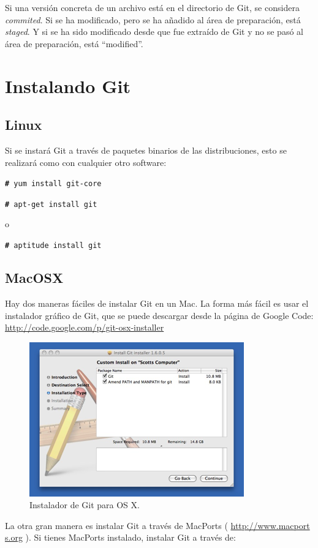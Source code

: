 \documentclass[12pt, spanish, oneside, onecolumn, a4paper]{report}
\newcommand{\rootshellcmd}[1]{

  \colorbox{mygray}{
    \indent\indent\texttt{\textbf{\footnotesize\#} #1}
  } 

}
\begin{document}
Si una versión concreta de un archivo está en el directorio de Git, se considera \emph{commited}. Si se ha modificado, pero se ha añadido al área de preparación, está \emph {staged}. Y si se ha sido modificado desde que fue extraído de Git y no se pasó al área de preparación, está ``modified''.

\clearpage
\section{Instalando Git} 
\label{sec:installgit} 

\subsection{Linux} 
\label{sec:installlinux} Si se instará Git a través de paquetes binarios de las distribuciones, esto se realizará como con cualquier otro software: 
\rootshellcmd{yum install git-core} 
\rootshellcmd{apt-get install git} o 
\rootshellcmd{aptitude install git} 

\subsection{MacOSX} 
\label{sec:installmac}

Hay dos maneras fáciles de instalar Git en un Mac. La forma más fácil es usar el instalador gráfico de Git, que se puede descargar desde la página de Google Code: \url{http://code.google.com/p/git-osx-installer}

\begin{figure} 
  \begin{center} 
    \includegraphics[width=.6\textwidth,keepaspectratio=true]{18333fig0107-tn.png} 
  \end{center} 
  \caption{ Instalador de Git para OS X.} 
\end{figure} 
\clearpage

La otra gran manera es instalar Git a través de MacPorts ( \url{http://www.macport s.org} ). Si tienes MacPorts instalado, instalar Git a través de: 
\end{document}
